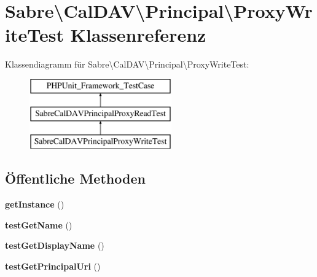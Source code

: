 \hypertarget{class_sabre_1_1_cal_d_a_v_1_1_principal_1_1_proxy_write_test}{}\section{Sabre\textbackslash{}Cal\+D\+AV\textbackslash{}Principal\textbackslash{}Proxy\+Write\+Test Klassenreferenz}
\label{class_sabre_1_1_cal_d_a_v_1_1_principal_1_1_proxy_write_test}
Klassendiagramm für Sabre\textbackslash{}Cal\+D\+AV\textbackslash{}Principal\textbackslash{}Proxy\+Write\+Test\+:\begin{figure}[H]
\begin{center}
\leavevmode
\includegraphics[height=3.000000cm]{class_sabre_1_1_cal_d_a_v_1_1_principal_1_1_proxy_write_test}
\end{center}
\end{figure}
\subsection*{Öffentliche Methoden}
\begin{DoxyCompactItemize}
\item 
\mbox{\label{class_sabre_1_1_cal_d_a_v_1_1_principal_1_1_proxy_write_test_abf177868feffd448daddbbcfe344402d}} 
{\bfseries get\+Instance} ()
\item 
\mbox{\label{class_sabre_1_1_cal_d_a_v_1_1_principal_1_1_proxy_write_test_a774c582e5460b974a85a79de9ab0c717}} 
{\bfseries test\+Get\+Name} ()
\item 
\mbox{\label{class_sabre_1_1_cal_d_a_v_1_1_principal_1_1_proxy_write_test_a9b15fb6a92a5364045446e703ce9c25b}} 
{\bfseries test\+Get\+Display\+Name} ()
\item 
\mbox{\label{class_sabre_1_1_cal_d_a_v_1_1_principal_1_1_proxy_write_test_aa33027d449c1cd643048ca2642f353d9}} 
{\bfseries test\+Get\+Principal\+Uri} ()
\end{DoxyCompactItemize}
